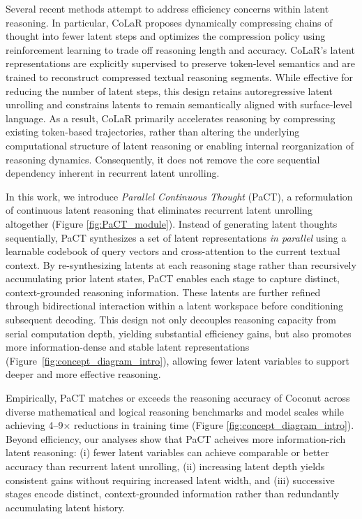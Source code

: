Several recent methods attempt to address efficiency concerns within latent reasoning. In particular, CoLaR \cite{tan2025think} proposes dynamically compressing chains of thought into fewer latent steps and optimizes the compression policy using reinforcement learning to trade off reasoning length and accuracy. CoLaR’s latent representations are explicitly supervised to preserve token-level semantics and are trained to reconstruct compressed textual reasoning segments. While effective for reducing the number of latent steps, this design retains autoregressive latent unrolling and constrains latents to remain semantically aligned with surface-level language. As a result, CoLaR primarily accelerates reasoning by compressing existing token-based trajectories, rather than altering the underlying computational structure of latent reasoning or enabling internal reorganization of reasoning dynamics. Consequently, it does not remove the core sequential dependency inherent in recurrent latent unrolling.

In this work, we introduce \emph{Parallel Continuous Thought} (PaCT), a reformulation of continuous latent reasoning that eliminates recurrent latent unrolling altogether (Figure \ref{fig:PaCT_module}). Instead of generating latent thoughts sequentially, PaCT synthesizes a set of latent representations \emph{in parallel} using a learnable codebook of query vectors and cross-attention to the current textual context. By re-synthesizing latents at each reasoning stage rather than recursively accumulating prior latent states, PaCT enables each stage to capture distinct, context-grounded reasoning information. These latents are further refined through bidirectional interaction within a latent workspace before conditioning subsequent decoding. This design not only decouples reasoning capacity from serial computation depth, yielding substantial efficiency gains, but also promotes more information-dense and stable latent representations (Figure~\ref{fig:concept_diagram_intro}), allowing fewer latent variables to support deeper and more effective reasoning.

Empirically, PaCT matches or exceeds the reasoning accuracy of Coconut across diverse mathematical and logical reasoning benchmarks \cite{dataset1,dataset2,dataset3} and model scales while achieving 4--9$\times$ reductions in training time (Figure \ref{fig:concept_diagram_intro}). 
Beyond efficiency, our analyses show that PaCT acheives more information-rich latent reasoning: (i) fewer latent variables can achieve comparable or better accuracy than recurrent latent unrolling, (ii) increasing latent depth yields consistent gains without requiring increased latent width, and (iii) successive stages encode distinct, context-grounded information rather than redundantly accumulating latent history.

